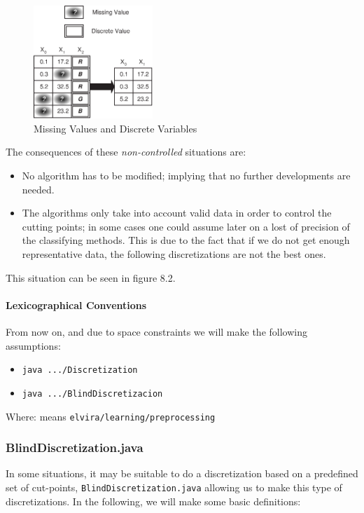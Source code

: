 \begin{figure}
\label{cap08:02}
\begin{center}
\includegraphics[width=45mm]{Learning/Preprocessing/fig/figure-8.02.ps} 
\end{center}
\caption{Missing Values and Discrete Variables}
\end{figure}

The consequences of these \emph{non-controlled} situations are:
\begin{itemize}
	\item	No algorithm has to be modified; implying that no further developments are needed.
	\item	The algorithms only take into account valid data in order to control the cutting points; in 
			some cases one could assume later on a lost of precision of the classifying methods. This is
			due to the fact that if we do not get enough representative data, the following discretizations
			are not the best ones.
\end{itemize}

This situation can be seen in figure 8.2.

\paragraph{Lexicographical Conventions}
From now on, and due to space constraints we will make the following assumptions:
\begin{itemize}
\item	\verb=java .../Discretization=
\item	\verb=java .../BlindDiscretizacion=
\end{itemize}
Where:  means  \verb=elvira/learning/preprocessing=
 
\subsubsection{BlindDiscretization.java}
In some situations, it may be suitable to do a discretization based on a predefined set of cut-points,
\verb=BlindDiscretization.java= allowing us to make this type of discretizations. In the following,
we will make some basic definitions:

